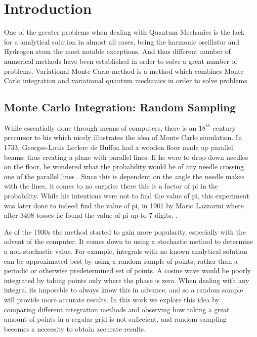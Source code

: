

\section{Introduction}
One of the greater problems when dealing with Quantum Mechanics is the lack for a analytical solution
in almost all cases, being the harmonic oscillator and Hydrogen atom the most notable exceptions.
And thus different number of numerical methods have been established in order to solve a great number
of problems. Variational Monte Carlo method is a method which combines Monte Carlo integration and variational
quantum mechanics in order to solve problems.


\subsection{Monte Carlo Integration: Random Sampling}
While essentially done through means of computers, there is an $18^{th}$ century precursor to
his which nicely illustrates the idea of Monte Carlo simulation.
In 1733, Georges-Louis Leclerc
de Buffon had a wooden floor made up parallel beams; thus creating a plane with parallel lines.
If he were to drop down needles on the floor, he wondered what the probability would be of
any needle crossing one of the parallel lines \cite{Buffon}. Since this is dependent on the
angle the needle makes with the lines, it comes to no surprise there this is a factor of pi
in the probability.
While his intentions were not to find the value of pi, this experiment
was later done to indeed find the value of pi, in 1901 by Mario Lazzarini where after 3408
tosses he found the value of pi up to 7 digits. \cite{Lazzarini}.


As of the 1930s the method started to gain more popularity, especially with the advent of the computer.
It comes down to using a stochastic method to determine a non-stochastic value. For example, integrals
with no known analytical solution can be approximated best by using a random sample of points, rather than
a periodic or otherwise predetermined set of points.
 A cosine wave would be poorly integrated by taking points
only where the phase is zero. When dealing with any integral its impossble to always know this in advance,
 and so a random sample will provide more accurate results.
In this work we explore this idea by comparing different integration methods and observing how taking a great
amount of points in a regular grid is not suficcient, and random sampling becomes a neccesity to obtain accurate results.

